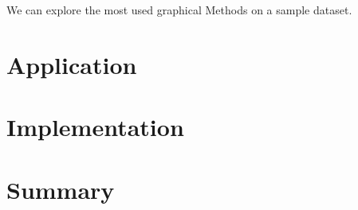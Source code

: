 \documentclass[a4paper, 12pt, oneside]{scrbook}
\begin{document}
			\noindent We can explore the most used graphical Methods on a sample dataset.
			
			
			 
	
	\chapter{Application}
	
	
	\chapter{Implementation}
	
	
	\chapter{Summary} %
	
	\frontmatter
	\printbibliography
\end{document}
